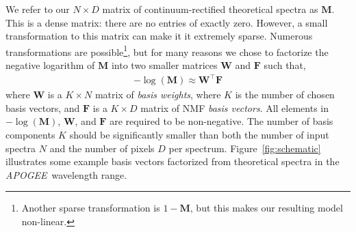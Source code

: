 \documentclass[modern]{aastex631}
\newcommand{\project}[1]{\textit{#1}}
\renewcommand{\vec}[1]{\mathbf{#1}}
\newcommand{\vectheta}{\boldsymbol{\theta}}
\newcommand{\vecpsi}{\boldsymbol{\psi}}
\newcommand{\vecW}{\mathbf{W}}
\newcommand{\vecH}{\mathbf{H}}
\newcommand{\apogee}{\project{APOGEE}}
\newcommand{\transpose}{^\top}
\begin{document}
We refer to our $N \times D$ matrix of continuum-rectified theoretical spectra as $\vec{M}$. This is a dense matrix: there are no entries of exactly zero. However, a small transformation
to this matrix can make it it extremely sparse. Numerous transformations are possible\footnote{Another sparse transformation is $1 - \vec{M}$, but this makes our resulting model non-linear.}, but for many reasons we chose to factorize the negative logarithm of $\vec{M}$ into two smaller matrices $\vec{W}$ and $\vec{F}$ such that,
\begin{eqnarray}
    \label{eq:nmf}
    -\log\left({\vec{M}}\right) \approx \vec{W}\transpose\vec{F}
\end{eqnarray}
where $\vec{W}$ is a $K \times N$ matrix of \emph{basis weights}, where $K$ is the number of chosen basis vectors, and $\vec{F}$ is a $K \times D$ matrix of NMF \emph{basis vectors}. All elements in $-\log\left({\vec{M}}\right)$, $\vec{W}$, and $\vec{F}$ are required to be non-negative. The number of basis components $K$ should be significantly smaller than both the number of input spectra $N$ and the number of pixels $D$ per spectrum. Figure~\ref{fig:schematic} illustrates some example basis vectors factorized from theoretical spectra in the \apogee\ wavelength range.\\





\end{document}
